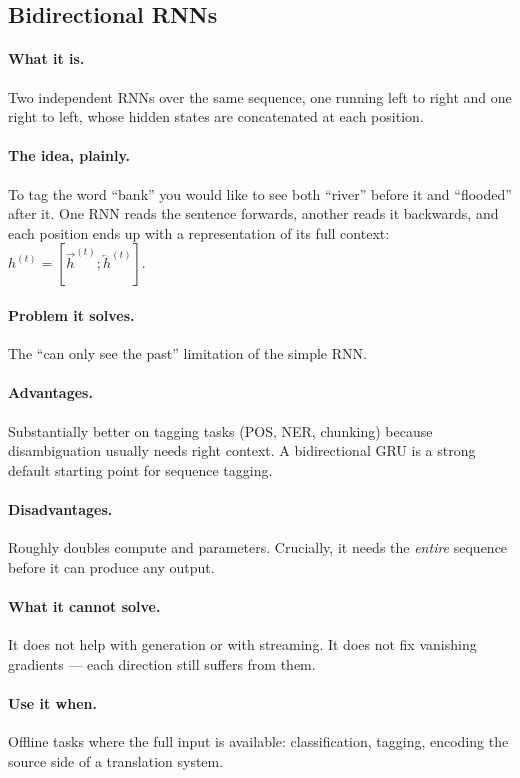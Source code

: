 \documentclass[11pt,a4paper]{article}
\begin{document}
\subsection{Bidirectional RNNs}

\paragraph{What it is.} Two independent RNNs over the same sequence, one running left to
right and one right to left, whose hidden states are concatenated at each position.

\paragraph{The idea, plainly.} To tag the word ``bank'' you would like to see both ``river''
before it and ``flooded'' after it. One RNN reads the sentence forwards, another reads it
backwards, and each position ends up with a representation of its full context:
$h^{(t)} = [\overrightarrow{h}^{(t)} ; \overleftarrow{h}^{(t)}]$.

\paragraph{Problem it solves.} The ``can only see the past'' limitation of the simple RNN.

\paragraph{Advantages.} Substantially better on tagging tasks (POS, NER, chunking) because
disambiguation usually needs right context. A bidirectional GRU is a strong default
starting point for sequence tagging.

\paragraph{Disadvantages.} Roughly doubles compute and parameters. Crucially, it needs the
\emph{entire} sequence before it can produce any output.

\paragraph{What it cannot solve.} It does not help with generation or with streaming. It
does not fix vanishing gradients --- each direction still suffers from them.

\paragraph{Use it when.} Offline tasks where the full input is available: classification,
tagging, encoding the source side of a translation system.
\end{document}
